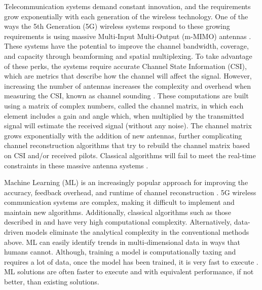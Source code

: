 Telecommunication systems demand constant innovation, and the requirements grow exponentially with each generation of the wireless technology. One of the ways the 5th Generation (5G) wireless systems respond to these growing requirements is using massive Multi-Input Multi-Output (m-MIMO) antennas \cite{Dahlman2018}. These systems have the potential to improve the channel bandwidth, coverage, and capacity through beamforming and spatial multiplexing. To take advantage of these perks, the systems require accurate Channel State Information (CSI), which are metrics that describe how the channel will affect the signal. However, increasing the number of antennas increases the complexity and overhead when measuring the CSI, known as channel sounding \cite{Mawatwal2020}. These computations are built using a matrix of complex numbers, called the channel matrix, in which each element includes a gain and angle which, when multiplied by the transmitted signal will estimate the received signal (without any noise). The channel matrix grows exponentially with the addition of new antennas, further complicating channel reconstruction algorithms that try to rebuild the channel matrix based on CSI and/or received pilots. Classical algorithms will fail to meet the real-time constraints in these massive antenna systems \cite{Li2020}.

Machine Learning (ML) is an increasingly popular approach for improving the accuracy, feedback overhead, and runtime of channel reconstruction \cite{Ye2018}. 5G wireless communication systems are complex, making it difficult to implement and maintain new algorithms. Additionally, classical algorithms such as those described in \cite{Han2019} and \cite{Liu2016} have very high computational complexity. Alternatively, data-driven models eliminate the analytical complexity in the conventional methods above. ML can easily identify trends in multi-dimensional data in ways that humans cannot. Although, training a model is computationally taxing and requires a lot of data, once the model has been trained, it is very fast to execute \cite{Li2020}. ML solutions are often faster to execute and with equivalent performance, if not better, than existing solutions. 

